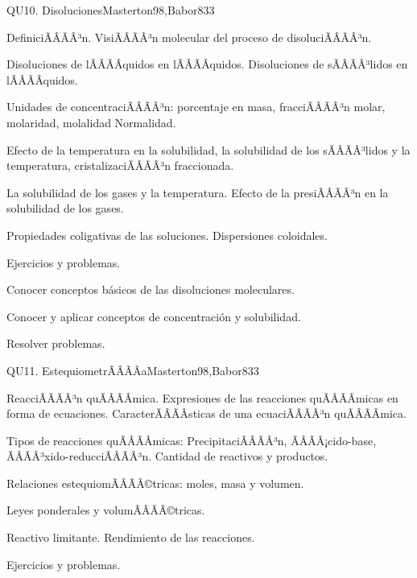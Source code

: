 \begin{sumilla}
\begin{unit}{QU10. Disoluciones}{Masterton98,Babor83}{3}
\begin{topicos}
      \item DefiniciÃÂÃÂ³n. VisiÃÂÃÂ³n molecular del proceso de disoluciÃÂÃÂ³n.
      \item Disoluciones de lÃÂÃÂ­quidos en lÃÂÃÂ­quidos. Disoluciones de sÃÂÃÂ³lidos en lÃÂÃÂ­quidos.
      \item Unidades de concentraciÃÂÃÂ³n: porcentaje en masa, fracciÃÂÃÂ³n molar, molaridad, molalidad Normalidad.
      \item Efecto de la temperatura en la solubilidad, la solubilidad de los sÃÂÃÂ³lidos y la temperatura, cristalizaciÃÂÃÂ³n fraccionada.
      \item La solubilidad de los gases y la temperatura. Efecto  de la presiÃÂÃÂ³n en la solubilidad de los gases.
      \item Propiedades coligativas de las soluciones. Dispersiones coloidales.
      \item Ejercicios y problemas.
    \end{topicos}

   \begin{objetivos}
      \item Conocer conceptos b\'asicos de las disoluciones moleculares.
      \item Conocer y aplicar conceptos de concentraci\'on y solubilidad.
      \item Resolver problemas.
   \end{objetivos}
\end{unit}

\begin{unit}{QU11. EstequiometrÃÂÃÂ­a}{Masterton98,Babor83}{3}
\begin{topicos}
      \item ReacciÃÂÃÂ³n quÃÂÃÂ­mica. Expresiones de las reacciones quÃÂÃÂ­micas en forma de ecuaciones. CaracterÃÂÃÂ­sticas de una ecuaciÃÂÃÂ³n quÃÂÃÂ­mica.
      \item Tipos de reacciones quÃÂÃÂ­micas: PrecipitaciÃÂÃÂ³n, ÃÂÃÂ¡cido-base, ÃÂÃÂ³xido-reducciÃÂÃÂ³n. Cantidad de reactivos y productos.
      \item Relaciones estequiomÃÂÃÂ©tricas: moles, masa y volumen.
      \item Leyes ponderales y volumÃÂÃÂ©tricas.
      \item Reactivo limitante. Rendimiento de las reacciones.
      \item Ejercicios y problemas.
    \end{topicos}


\end{unit}
\end{sumilla}
